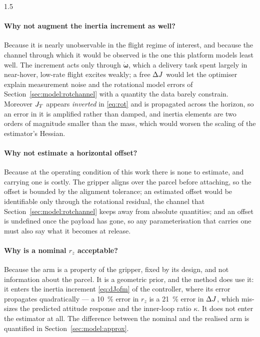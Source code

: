 \begin{spacing}{1.5}
\paragraph{Why not augment the inertia increment as well?} Because it is nearly
unobservable in the flight regime of interest, and because the channel through
which it would be observed is the one this platform models least well. The
increment acts only through $\dot{\bm{\omega}}$, which a delivery task spent
largely in near-hover, low-rate flight excites weakly; a free $\Delta J$ would let the
optimiser explain measurement noise and the rotational model errors of
Section~\ref{sec:model:rotchannel} with a quantity the data barely constrain.
Moreover $J_T$ appears \emph{inverted} in \eqref{eq:rot} and is propagated across
the horizon, so an error in it is amplified rather than damped, and inertia
elements are two orders of magnitude smaller than the mass, which would worsen
the scaling of the estimator's Hessian.

\paragraph{Why not estimate a horizontal offset?} Because at the operating
condition of this work there is none to estimate, and carrying one is costly. The
gripper aligns over the parcel before attaching, so the offset is bounded by the
alignment tolerance; an estimated offset would be identifiable only through the
rotational residual, the channel that Section~\ref{sec:model:rotchannel} keeps
away from absolute quantities; and an offset is undefined once the payload has
gone, so any parameterisation that carries one must also say what it becomes at
release.

\paragraph{Why is a nominal $r_z$ acceptable?} Because the arm is a property of
the gripper, fixed by its design, and not information about the parcel. It is a
geometric prior, and the method does use it: it enters the inertia increment
\eqref{eq:dJofm} of the controller, where its error propagates quadratically ---
a \SI{10}{\percent} error in $r_z$ is a \SI{21}{\percent} error in $\Delta J$, which
mis-sizes the predicted attitude response and the inner-loop ratio $\kappa$. It
does not enter the estimator at all. The difference between the nominal and the realised arm is quantified
in Section~\ref{sec:model:approx}.


\end{spacing}
